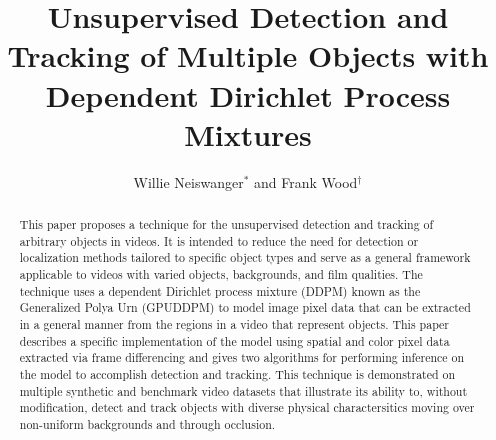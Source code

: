 \documentclass[smallcondensed, final]{svjour3}
\begin{document}

\title{Unsupervised Detection and Tracking of Multiple Objects with Dependent Dirichlet Process Mixtures}



\author{Willie Neiswanger$^{*}$ and Frank Wood$^{\dagger}$}



\date{}  %

\maketitle






\begin{abstract}
This paper proposes a technique for the unsupervised detection and tracking of arbitrary objects in videos. It is intended to reduce the need for detection or localization methods tailored to specific object types and serve as a general framework applicable to videos with varied objects, backgrounds, and film qualities. The technique uses a dependent Dirichlet process mixture (DDPM) known as the Generalized Polya Urn (GPUDDPM) to model image pixel data that can be extracted in a general manner from the regions in a video that represent objects. This paper describes a specific implementation of the model using spatial and color pixel data extracted via frame differencing and gives two algorithms for performing inference on the model to accomplish detection and tracking. This technique is demonstrated on multiple synthetic and benchmark video datasets that illustrate its ability to, without modification, detect and track objects with diverse physical charactersitics moving over non-uniform backgrounds and through occlusion.
\end{abstract}
\end{document}
